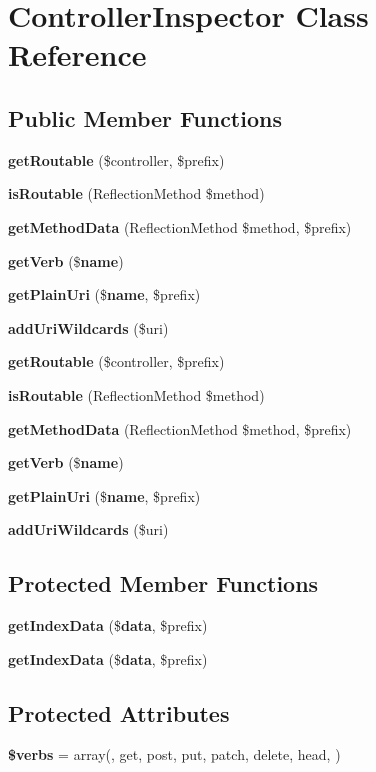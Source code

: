 \section{Controller\+Inspector Class Reference}
\label{class_illuminate_1_1_routing_1_1_controller_inspector}
\subsection*{Public Member Functions}
\begin{DoxyCompactItemize}
\item 
{\bf get\+Routable} (\$controller, \$prefix)
\item 
{\bf is\+Routable} (Reflection\+Method \$method)
\item 
{\bf get\+Method\+Data} (Reflection\+Method \$method, \$prefix)
\item 
{\bf get\+Verb} (\${\bf name})
\item 
{\bf get\+Plain\+Uri} (\${\bf name}, \$prefix)
\item 
{\bf add\+Uri\+Wildcards} (\$uri)
\item 
{\bf get\+Routable} (\$controller, \$prefix)
\item 
{\bf is\+Routable} (Reflection\+Method \$method)
\item 
{\bf get\+Method\+Data} (Reflection\+Method \$method, \$prefix)
\item 
{\bf get\+Verb} (\${\bf name})
\item 
{\bf get\+Plain\+Uri} (\${\bf name}, \$prefix)
\item 
{\bf add\+Uri\+Wildcards} (\$uri)
\end{DoxyCompactItemize}
\subsection*{Protected Member Functions}
\begin{DoxyCompactItemize}
\item 
{\bf get\+Index\+Data} (\${\bf data}, \$prefix)
\item 
{\bf get\+Index\+Data} (\${\bf data}, \$prefix)
\end{DoxyCompactItemize}
\subsection*{Protected Attributes}
\begin{DoxyCompactItemize}
\item 
{\bf \$verbs} = array(\textquotesingle{}, \textquotesingle{}get\textquotesingle{}, \textquotesingle{}post\textquotesingle{}, \textquotesingle{}put\textquotesingle{}, \textquotesingle{}patch\textquotesingle{}, \textquotesingle{}delete\textquotesingle{}, \textquotesingle{}head\textquotesingle{}, \textquotesingle{})
\end{DoxyCompactItemize}


